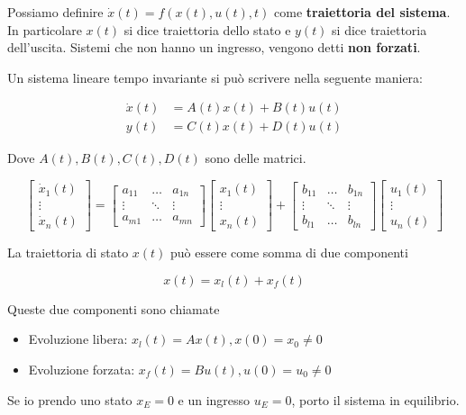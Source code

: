 \documentclass{article}
\begin{document}
Possiamo definire \(\dot{x}(t) = f(x(t), u(t), t)\) come \textbf{traiettoria del sistema}.
In particolare \(x(t)\) si dice traiettoria dello stato e \(y(t)\) si dice traiettoria dell'uscita.
Sistemi che non hanno un ingresso, vengono detti \textbf{non forzati}.

\vspace{10pt}

Un sistema lineare tempo invariante si può scrivere nella seguente maniera:

\begin{align*}
  \dot{x}(t) &= A(t)x(t) + B(t)u(t)\\
  y(t) &= C(t)x(t) + D(t)u(t)
\end{align*}

Dove \(A(t), B(t), C(t), D(t)\) sono delle matrici.

\[
  \begin{bmatrix} \dot{x}_1(t) \\ \vdots \\ \dot{x}_n(t) \end{bmatrix}
  =
  \begin{bmatrix}
    a_{11} & \dots & a_{1n}\\
    \vdots & \ddots & \vdots\\
    a_{m1} & \dots & a_{mn}
  \end{bmatrix} 
  \begin{bmatrix} x_1(t) \\ \vdots \\ x_n(t) \end{bmatrix}
  +
  \begin{bmatrix}
    b_{11} & \dots & b_{1n}\\
    \vdots & \ddots & \vdots\\
    b_{l1} & \dots & b_{ln}
  \end{bmatrix}
  \begin{bmatrix} u_1(t) \\ \vdots \\ u_n(t) \end{bmatrix}
\]

La traiettoria di stato \(x(t)\) può essere come somma di due componenti

\[ x(t) = x_l(t) + x_f(t) \]

Queste due componenti sono chiamate

\begin{itemize}
\item Evoluzione libera: \(x_l(t) = A x(t) , x(0) = x_0 \neq 0\)
\item Evoluzione forzata: \(x_f(t) = B u(t) , u(0) = u_0 \neq 0\)
\end{itemize}

Se io prendo uno stato \(x_E=0\) e un ingresso \(u_E=0\), porto il sistema in equilibrio.
\end{document}
